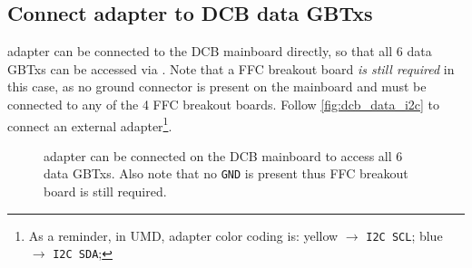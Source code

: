 \subsection{Connect \itwoc adapter to DCB data GBTxs}
\label{sec:dcb-data-i2c}
\itwoc adapter can be connected to the DCB mainboard directly, so that all 6
data GBTxs can be accessed via \itwoc.
Note that a FFC breakout board \emph{is still required} in this case, as no
ground connector is present on the mainboard and must be connected to any of the
4 FFC breakout boards.
Follow \autoref{fig:dcb_data_i2c} to connect an external \itwoc
adapter\footnote{
    As a reminder, in UMD, \itwoc adapter color coding is:
    yellow $\rightarrow$ \texttt{I2C SCL};
    blue $\rightarrow$ \texttt{I2C SDA};
}.

\begin{figure}[!ht]
\centering
{}
\caption{
    \itwoc adapter can be connected on the DCB mainboard to access all 6 data
    GBTxs.
    Also note that no \texttt{GND} is present thus FFC breakout board is still
    required.
}
\label{fig:dcb_data_i2c}
\end{figure}
